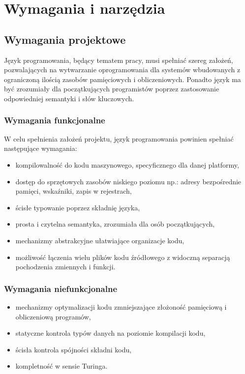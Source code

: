 \chapter{Wymagania i narzędzia}
\label{ch:wymagania-i-narzedzia}

\section{Wymagania projektowe}

Język programowania, będący tematem pracy, musi spełniać szereg założeń, pozwalających na wytwarzanie oprogramowania dla systemów wbudowanych z ograniczoną ilością zasobów pamięciowych i obliczeniowych. Ponadto język ma być zrozumiały dla początkujących programistów poprzez zastosowanie odpowiedniej semantyki i słów kluczowych.

\subsection{Wymagania funkcjonalne}
W celu spełnienia założeń projektu, język programowania powinien spełniać następujące wymagania:
\begin{itemize}
\item kompilowalność do kodu maszynowego, specyficznego dla danej platformy,
\item dostęp do sprzętowych zasobów niskiego poziomu np.: adresy bezpośrednie pamięci, wskaźniki, zapis w rejestrach,
\item ścisłe typowanie poprzez składnię języka,
\item prosta i czytelna semantyka, zrozumiała dla osób początkujących,
\item mechanizmy abstrakcyjne ułatwiające organizacje kodu,
\item możliwość łączenia wielu plików kodu źródłowego z widoczną separacją pochodzenia zmiennych i funkcji.
\end{itemize}

\subsection{Wymagania niefunkcjonalne}

\begin{itemize}
\item mechanizmy optymalizacji kodu zmniejszające złożoność pamięciową i obliczeniową programów,
\item statyczne kontrola typów danych na poziomie kompilacji kodu,
\item ścisła kontrola spójności składni kodu,
\item kompletność w sensie Turinga.
\end{itemize}

